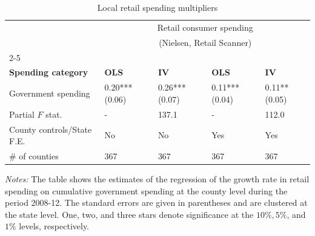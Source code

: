 \documentclass[\latexroot/\projectname]{subfiles}
\begin{document}
\begin{table}[h]
  \centering
  \caption{Local retail spending multipliers\whenintegrated{\label{tab:empirics-retail-multipliers}}}
  \begin{tabular}{lllll}
    \hline
     & \multicolumn{4}{c}{Retail consumer spending} \\
     & \multicolumn{4}{c}{(Nielsen, Retail Scanner)} \\
     \cline{2-5} \\
    \textbf{Spending category} & \textbf{OLS} & \textbf{IV} & \textbf{OLS} & \textbf{IV} \\
    \hline
    Government spending & 0.20*** (0.06) & 0.26*** (0.07) & 0.11*** (0.04) & 0.11** (0.05) \\
    Partial $F$ stat. & - & 137.1 & - & 112.0 \\
    County controls/State F.E. & No & No & Yes & Yes \\
    \# of counties & 367 & 367 & 367 & 367 \\
    \hline
  \end{tabular}
  \begin{flushleft}
    \footnotesize
    \textit{Notes:} The table shows the estimates of the regression of the growth rate in retail spending on cumulative government spending at the county level during the period 2008-12. The standard errors are given in parentheses and are clustered at the state level. One, two, and three stars denote significance at the $10 \%, 5 \%$, and $1 \%$ levels, respectively.
  \end{flushleft}
\end{table}

\smartbib
\end{document}
